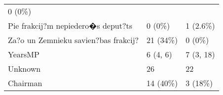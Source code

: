 \documentclass[
]{article}
\begin{document}
\begin{longtable}[]{@{}lll@{}}
\begin{minipage}[t]{0.17\columnwidth}
0 (0\%)\strut
\end{minipage}\tabularnewline
\begin{minipage}[t]{0.57\columnwidth}\raggedright
Pie frakcij?m nepiedero�s deput?ts\strut
\end{minipage} & \begin{minipage}[t]{0.18\columnwidth}\raggedright
0 (0\%)\strut
\end{minipage} & \begin{minipage}[t]{0.17\columnwidth}\raggedright
1 (2.6\%)\strut
\end{minipage}\tabularnewline
\begin{minipage}[t]{0.57\columnwidth}\raggedright
Za?o un Zemnieku savien?bas frakcij?\strut
\end{minipage} & \begin{minipage}[t]{0.18\columnwidth}\raggedright
21 (34\%)\strut
\end{minipage} & \begin{minipage}[t]{0.17\columnwidth}\raggedright
0 (0\%)\strut
\end{minipage}\tabularnewline
\begin{minipage}[t]{0.57\columnwidth}\raggedright
YearsMP\strut
\end{minipage} & \begin{minipage}[t]{0.18\columnwidth}\raggedright
6 (4, 6)\strut
\end{minipage} & \begin{minipage}[t]{0.17\columnwidth}\raggedright
7 (3, 18)\strut
\end{minipage}\tabularnewline
\begin{minipage}[t]{0.57\columnwidth}\raggedright
Unknown\strut
\end{minipage} & \begin{minipage}[t]{0.18\columnwidth}\raggedright
26\strut
\end{minipage} & \begin{minipage}[t]{0.17\columnwidth}\raggedright
22\strut
\end{minipage}\tabularnewline
\begin{minipage}[t]{0.57\columnwidth}\raggedright
Chairman\strut
\end{minipage} & \begin{minipage}[t]{0.18\columnwidth}\raggedright
14 (40\%)\strut
\end{minipage} & \begin{minipage}[t]{0.17\columnwidth}\raggedright
3 (18\%)\strut
\end{minipage}\tabularnewline

\end{longtable}
\end{document}
